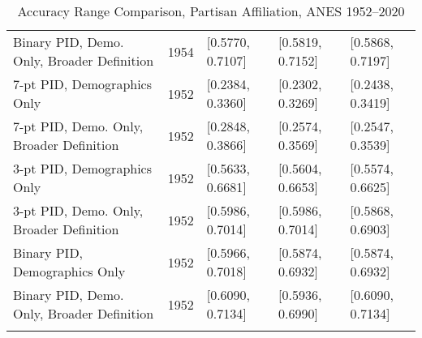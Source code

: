 \begin{longtable}{lrlll}
  Binary PID, Demo. Only, Broader Definition & 1954 & [0.5770, 0.7107] & [0.5819, 0.7152] & [0.5868, 0.7197] \\ 
  7-pt PID, Demographics Only & 1952 & [0.2384, 0.3360] & [0.2302, 0.3269] & [0.2438, 0.3419] \\ 
  7-pt PID, Demo. Only, Broader Definition & 1952 & [0.2848, 0.3866] & [0.2574, 0.3569] & [0.2547, 0.3539] \\ 
  3-pt PID, Demographics Only & 1952 & [0.5633, 0.6681] & [0.5604, 0.6653] & [0.5574, 0.6625] \\ 
  3-pt PID, Demo. Only, Broader Definition & 1952 & [0.5986, 0.7014] & [0.5986, 0.7014] & [0.5868, 0.6903] \\ 
  Binary PID, Demographics Only & 1952 & [0.5966, 0.7018] & [0.5874, 0.6932] & [0.5874, 0.6932] \\ 
  Binary PID, Demo. Only, Broader Definition & 1952 & [0.6090, 0.7134] & [0.5936, 0.6990] & [0.6090, 0.7134] \\ 
   \bottomrule
\caption{Accuracy Range Comparison, Partisan Affiliation, ANES 1952--2020} 
\label{tab:ANES_pid_accuracy}
\end{longtable}
